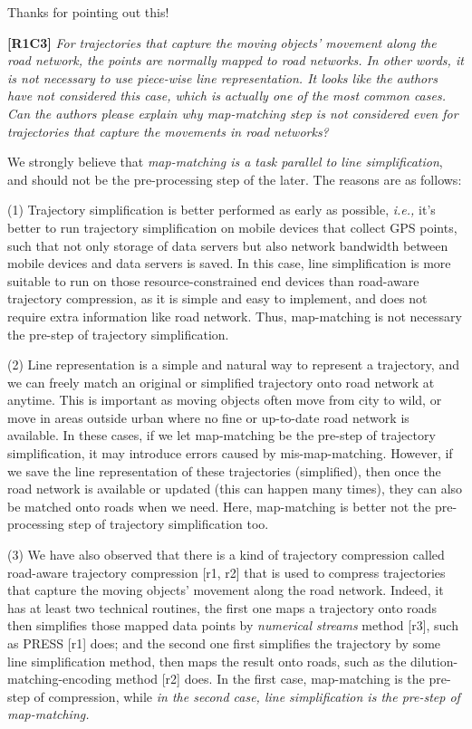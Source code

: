 \documentclass{letter}
\newcommand{\ie}{\emph{i.e.,}\xspace}
\begin{document}
Thanks for pointing out this!

\textbf{[R1C3]} \emph{For trajectories that capture the moving objects' movement along the road network, the points are normally mapped to road networks. In other words, it is not necessary to use piece-wise line representation. It looks like the authors have not considered this case, which is actually one of the most common cases. Can the authors please explain why map-matching step is not considered even for trajectories that capture the movements in road networks?}


We strongly believe that \emph{map-matching is a task parallel to line simplification}, and should not be the pre-processing step of the later. The reasons are as follows:

(1) Trajectory simplification is better performed as early as possible, \ie it's better to run trajectory simplification on mobile devices that collect GPS points, such that not only storage of data servers but also network bandwidth between mobile devices and data servers is saved. 
In this case, line simplification is more suitable to run on those resource-constrained end devices than road-aware trajectory compression, as it is  simple and easy to implement, and does not require extra information like road network. Thus, map-matching is not necessary the pre-step of trajectory simplification.

(2) Line representation is a simple and natural way to represent a trajectory, and we can freely match an original or simplified trajectory onto road network at anytime. This is important as moving objects often move from city to wild, or move in areas outside urban where no fine or up-to-date road network is available. In these cases, if we let map-matching be the pre-step of trajectory simplification, it may introduce errors caused by mis-map-matching. However, if we save the line representation of these trajectories (simplified), then once the road network is available or updated (this can happen many times), they can also be matched onto roads when we need. Here, map-matching is better not the pre-processing step of trajectory simplification too. 

(3) We have also observed that there is a kind of trajectory compression called road-aware trajectory compression [r1, r2] that is used to compress trajectories that capture the moving objects' movement along the road network. Indeed, it has at least two technical routines, the first one maps a trajectory onto roads then simplifies those mapped data points by \emph{numerical streams} method [r3], such as PRESS [r1] does; and the second one first simplifies the trajectory by some line simplification method, then maps the result onto roads, such as the dilution-matching-encoding method [r2] does. In the first case, map-matching is the pre-step of compression, while \emph{in the second case, line simplification is the pre-step of map-matching.} 
%
\end{document}
